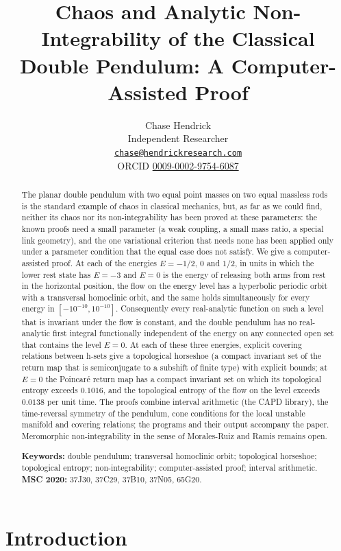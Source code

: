 \documentclass[11pt]{article}
\title{Chaos and Analytic Non-Integrability of the Classical Double Pendulum: A Computer-Assisted Proof}
\author{Chase Hendrick\\[0.2em] {\small Independent Researcher}\\ {\small\href{mailto:chase@hendrickresearch.com}{\texttt{chase@hendrickresearch.com}}}\\ {\small ORCID \href{https://orcid.org/0009-0002-9754-6087}{0009-0002-9754-6087}}}
\date{}
\theoremstyle{definition}
\begin{document}
\maketitle

\begin{abstract}
The planar double pendulum with two equal point masses on two equal massless rods is the standard example of chaos in classical mechanics, but, as far as we could find, neither its chaos nor its non-integrability has been proved at these parameters: the known proofs need a small parameter (a weak coupling, a small mass ratio, a special link geometry), and the one variational criterion that needs none has been applied only under a parameter condition that the equal case does not satisfy. We give a computer-assisted proof. At each of the energies $E = -1/2$, $0$ and $1/2$, in units in which the lower rest state has $E = -3$ and $E = 0$ is the energy of releasing both arms from rest in the horizontal position, the flow on the energy level has a hyperbolic periodic orbit with a transversal homoclinic orbit, and the same holds simultaneously for every energy in $[-10^{-10}, 10^{-10}]$. Consequently every real-analytic function on such a level that is invariant under the flow is constant, and the double pendulum has no real-analytic first integral functionally independent of the energy on any connected open set that contains the level $E = 0$. At each of these three energies, explicit covering relations between h-sets give a topological horseshoe (a compact invariant set of the return map that is semiconjugate to a subshift of finite type) with explicit bounds; at $E = 0$ the Poincar\'e return map has a compact invariant set on which its topological entropy exceeds $0.1016$, and the topological entropy of the flow on the level exceeds $0.0138$ per unit time. The proofs combine interval arithmetic (the CAPD library), the time-reversal symmetry of the pendulum, cone conditions for the local unstable manifold and covering relations; the programs and their output accompany the paper. Meromorphic non-integrability in the sense of Morales-Ruiz and Ramis remains open.

\medskip
\noindent\textbf{Keywords:} double pendulum; transversal homoclinic orbit; topological horseshoe; topological entropy; non-integrability; computer-assisted proof; interval arithmetic.\\
\textbf{MSC 2020:} 37J30, 37C29, 37B10, 37N05, 65G20.
\end{abstract}

\section{Introduction}
\end{document}
